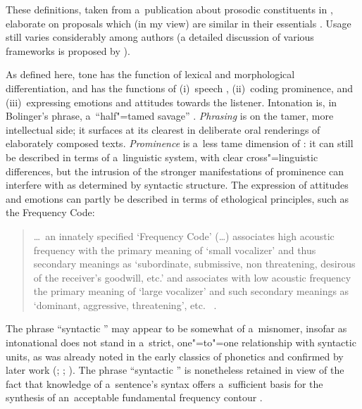 These definitions, taken from a~publication about prosodic constituents in 
\citep{vaissiereetal2006}, elaborate on proposals which (in my view) are similar in their essentials
\citep{coustenobleetal1937,delattre1965,martin1977b,rossi1999}. Usage
still varies considerably among authors (a detailed discussion of various frameworks is proposed
by \citealt{dicristo1998}).

As defined here, tone has the function of lexical and morphological differentiation, and
 has the functions of (i)~speech , (ii)~coding prominence, and (iii)~expressing emotions and attitudes towards the listener. Intonation is, in Bolinger’s phrase, a~“half"=tamed savage”
\citep[475]{bolinger1978}. \textit{Phrasing} is on the tamer, more intellectual side; it surfaces at
its clearest in deliberate oral renderings of elaborately composed texts. \textit{Prominence} is
a~less tame dimension of : it can still be described in terms of a~linguistic system, with
clear cross"=linguistic differences, but the intrusion of the stronger manifestations of prominence
can interfere with  as determined by syntactic structure. The expression of attitudes
and emotions can partly be described in terms of ethological principles, such as the Frequency Code:
 
\begin{quotation}
{\dots}~an innately specified ‘Frequency
Code’ ({\dots}) associates high acoustic frequency with the primary meaning of ‘small vocalizer’ and thus secondary meanings as ‘subordinate, submissive, non threatening, desirous of the receiver's goodwill, etc.’ and associates with low acoustic frequency the primary meaning of ‘large vocalizer’ and such secondary meanings as ‘dominant, aggressive, threatening’, etc.~ \citep[1]{ohala1984}.
\end{quotation}
	
The phrase “syntactic ” may appear to be somewhat of a~misnomer, insofar as intonational  does not stand in a~strict, one"=to"=one relationship with syntactic units, as was
already noted in the early classics of phonetics \citep{grammont1933} and confirmed by later work
(\citealt{selkirk1972}; \citeyear[231]{selkirk2000}; \citealt{martin1981}). The phrase “syntactic
” is nonetheless retained in view of the fact that knowledge of a~sentence’s syntax offers
a~sufficient basis for the synthesis of an~acceptable fundamental frequency {contour}
\citep{vaissiere1971}.

